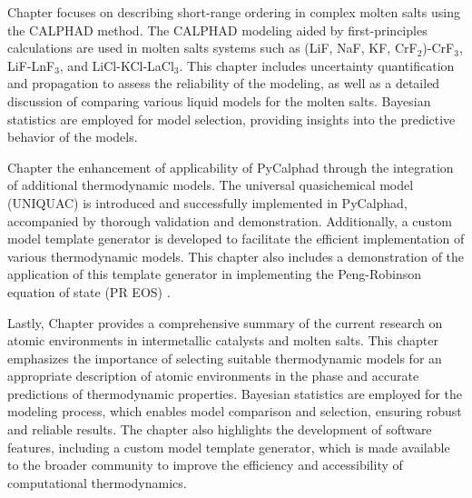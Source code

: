 Chapter  focuses on describing short-range ordering in complex molten salts using the CALPHAD method. The CALPHAD modeling aided by first-principles calculations are used in molten salts systems such as (LiF, NaF, KF, CrF$_2$)-CrF$_3$, LiF-LnF$_3$, and LiCl-KCl-LaCl$_3$. This chapter includes uncertainty quantification and propagation to assess the reliability of the modeling, as well as a detailed discussion of comparing various liquid models for the molten salts. Bayesian statistics are employed for model selection, providing insights into the predictive behavior of the models.

Chapter  the enhancement of applicability of PyCalphad through the integration of additional thermodynamic models. The universal quasichemical model (UNIQUAC) \cite{abrams1975statistical} is introduced and successfully implemented in PyCalphad, accompanied by thorough validation and demonstration. Additionally, a custom model template generator is developed to facilitate the efficient implementation of various thermodynamic models. This chapter also includes a demonstration of the application of this template generator in implementing the Peng-Robinson equation of state (PR EOS) \cite{peng1976new}.

Lastly, Chapter  provides a comprehensive summary of the current research on atomic environments in intermetallic catalysts and molten salts. This chapter emphasizes the importance of selecting suitable thermodynamic models for an appropriate description of atomic environments in the phase and accurate predictions of thermodynamic properties. Bayesian statistics are employed for the modeling process, which enables model comparison and selection, ensuring robust and reliable results. The chapter also highlights the development of software features, including a custom model template generator, which is made available to the broader community to improve the efficiency and accessibility of computational thermodynamics.